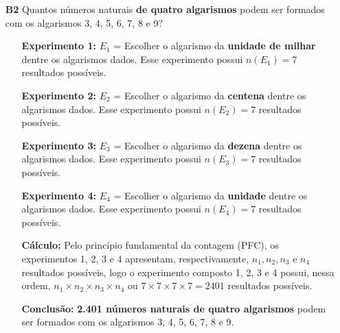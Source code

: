 \documentclass[a4paper,12pt]{article}
\begin{document}
\begin{enumerate}
\item[\textbf{B2}] Quantos números naturais \textbf{de quatro algarismos} podem ser formados com os algarismos 3, 4, 5, 6, 7, 8 e 9?
 \begin{itemize}
     \item[\ding{172}] \textbf{Experimento 1:} $E_1$ = Escolher o algarismo da \textbf{unidade de milhar} dentre os algarismos dados. Esse experimento possui $n(E_1) = 7$ resultados possíveis.
     \item[\ding{173}] \textbf{Experimento 2:} $E_2$ = Escolher o algarismo da \textbf{centena} dentre os algarismos dados. Esse experimento possui $n(E_2) = 7$ resultados possíveis.
     \item[\ding{174}] \textbf{Experimento 3:} $E_3$ = Escolher o algarismo da \textbf{dezena} dentre os algarismos dados. Esse experimento possui $n(E_3) = 7$ resultados possíveis.
     \item[\ding{175}] \textbf{Experimento 4:} $E_4$ = Escolher o algarismo da \textbf{unidade} dentre os algarismos dados. Esse experimento possui $n(E_4) = 7$ resultados possíveis.    
     \item[\ding{176}] \textbf{Cálculo:} Pelo princípio fundamental da contagem (PFC), os experimentos 1, 2, 3 e 4 apresentam, respectivamente, $n_{1}, n_{2}, n_{3} \textrm{ e } n_{4}$ resultados possíveis, logo o experimento composto 1, 2, 3 e 4 possui, nessa ordem, $n_{1} \times n_{2} \times n_{3} \times n_{4}$ ou $7 \times 7 \times 7 \times 7 = 2401$ resultados possíveis.
     \item[\ding{177}] \textbf{Conclusão:} \textbf{2.401 números naturais de quatro algarismos} podem ser formados com os algarismos 3, 4, 5, 6, 7, 8 e 9. 
   \end{itemize}


\end{enumerate}
\end{document}
